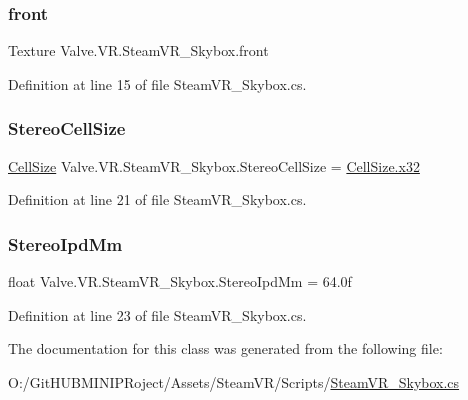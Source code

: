 \subsubsection{\texorpdfstring{front}{front}}
{\footnotesize\ttfamily Texture Valve.\+V\+R.\+Steam\+V\+R\+\_\+\+Skybox.\+front}



Definition at line 15 of file Steam\+V\+R\+\_\+\+Skybox.\+cs.

\mbox{\label{class_valve_1_1_v_r_1_1_steam_v_r___skybox_a0b108f931f6c17f472522ff230321874}} 
\subsubsection{\texorpdfstring{StereoCellSize}{StereoCellSize}}
{\footnotesize\ttfamily \mbox{\hyperlink{class_valve_1_1_v_r_1_1_steam_v_r___skybox_ad000cf5b884042065bb7e3bc5bdba27a}{Cell\+Size}} Valve.\+V\+R.\+Steam\+V\+R\+\_\+\+Skybox.\+Stereo\+Cell\+Size = \mbox{\hyperlink{class_valve_1_1_v_r_1_1_steam_v_r___skybox_ad000cf5b884042065bb7e3bc5bdba27aa4f3143a9df778e1295ff581a6e7f1c1b}{Cell\+Size.\+x32}}}



Definition at line 21 of file Steam\+V\+R\+\_\+\+Skybox.\+cs.

\mbox{\label{class_valve_1_1_v_r_1_1_steam_v_r___skybox_abf622e00d773692fb0d1213d95b3ad8c}} 
\subsubsection{\texorpdfstring{StereoIpdMm}{StereoIpdMm}}
{\footnotesize\ttfamily float Valve.\+V\+R.\+Steam\+V\+R\+\_\+\+Skybox.\+Stereo\+Ipd\+Mm = 64.\+0f}



Definition at line 23 of file Steam\+V\+R\+\_\+\+Skybox.\+cs.



The documentation for this class was generated from the following file\+:\begin{DoxyCompactItemize}
\item 
O\+:/\+Git\+H\+U\+B\+M\+I\+N\+I\+P\+Roject/\+Assets/\+Steam\+V\+R/\+Scripts/\mbox{\hyperlink{_steam_v_r___skybox_8cs}{Steam\+V\+R\+\_\+\+Skybox.\+cs}}\end{DoxyCompactItemize}
